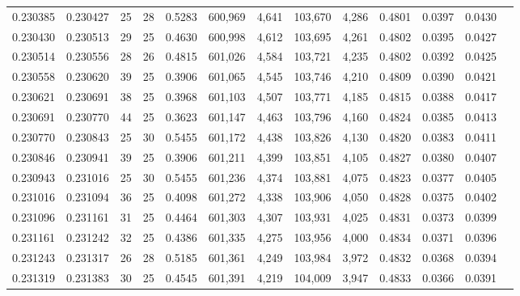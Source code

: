 \begin{tabular}{rrrrrrrrrrrrr}
0.230385 & 0.230427 &  25 &  28 &                                     0.5283 & 600,969 &   4,641 & 103,670 &   4,286 & 0.4801 & 0.0397 & 0.0430 \\
0.230430 & 0.230513 &  29 &  25 &                                     0.4630 & 600,998 &   4,612 & 103,695 &   4,261 & 0.4802 & 0.0395 & 0.0427 \\
0.230514 & 0.230556 &  28 &  26 &                                     0.4815 & 601,026 &   4,584 & 103,721 &   4,235 & 0.4802 & 0.0392 & 0.0425 \\
0.230558 & 0.230620 &  39 &  25 &                                     0.3906 & 601,065 &   4,545 & 103,746 &   4,210 & 0.4809 & 0.0390 & 0.0421 \\
0.230621 & 0.230691 &  38 &  25 &                                     0.3968 & 601,103 &   4,507 & 103,771 &   4,185 & 0.4815 & 0.0388 & 0.0417 \\
0.230691 & 0.230770 &  44 &  25 &                                     0.3623 & 601,147 &   4,463 & 103,796 &   4,160 & 0.4824 & 0.0385 & 0.0413 \\
0.230770 & 0.230843 &  25 &  30 &                                     0.5455 & 601,172 &   4,438 & 103,826 &   4,130 & 0.4820 & 0.0383 & 0.0411 \\
0.230846 & 0.230941 &  39 &  25 &                                     0.3906 & 601,211 &   4,399 & 103,851 &   4,105 & 0.4827 & 0.0380 & 0.0407 \\
0.230943 & 0.231016 &  25 &  30 &                                     0.5455 & 601,236 &   4,374 & 103,881 &   4,075 & 0.4823 & 0.0377 & 0.0405 \\
0.231016 & 0.231094 &  36 &  25 &                                     0.4098 & 601,272 &   4,338 & 103,906 &   4,050 & 0.4828 & 0.0375 & 0.0402 \\
0.231096 & 0.231161 &  31 &  25 &                                     0.4464 & 601,303 &   4,307 & 103,931 &   4,025 & 0.4831 & 0.0373 & 0.0399 \\
0.231161 & 0.231242 &  32 &  25 &                                     0.4386 & 601,335 &   4,275 & 103,956 &   4,000 & 0.4834 & 0.0371 & 0.0396 \\
0.231243 & 0.231317 &  26 &  28 &                                     0.5185 & 601,361 &   4,249 & 103,984 &   3,972 & 0.4832 & 0.0368 & 0.0394 \\
0.231319 & 0.231383 &  30 &  25 &                                     0.4545 & 601,391 &   4,219 & 104,009 &   3,947 & 0.4833 & 0.0366 & 0.0391 \\

\end{tabular}
